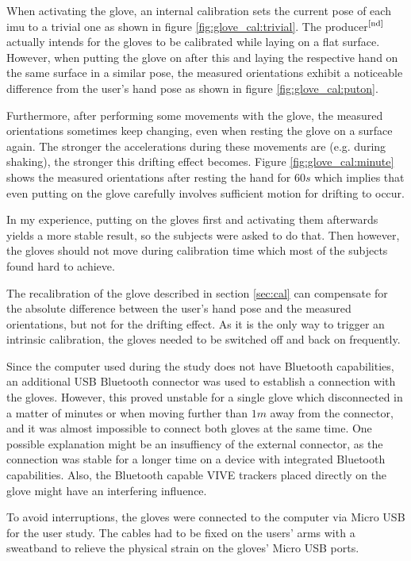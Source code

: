 \documentclass[hyperref, bachelorofscience]{cgvpub}
\newcommand{\newcite}[1]{$ ^{\text{\cite{#1}}} $}
\begin{document}
When activating the glove, an internal calibration sets the current pose of each \acrshort{imu} to a trivial one as shown in figure \ref{fig:glove_cal:trivial}. The producer\newcite{nd} actually intends for the gloves to be calibrated while laying on a flat surface. However, when putting the glove on after this and laying the respective hand on the same surface in a similar pose, the measured orientations exhibit a noticeable difference from the user's hand pose as shown in figure \ref{fig:glove_cal:puton}. 

Furthermore, after performing some movements with the glove, the measured orientations sometimes keep changing, even when resting the glove on a surface again. The stronger the accelerations during these movements are (e.g. during shaking), the stronger this drifting effect becomes. Figure \ref{fig:glove_cal:minute} shows the measured orientations after resting the hand for $ 60s $ which implies that even putting on the glove carefully involves sufficient motion for drifting to occur.

In my experience, putting on the gloves first and activating them afterwards yields a more stable result, so the subjects were asked to do that. Then however, the gloves should not move during calibration time which most of the subjects found hard to achieve.

The recalibration of the glove described in section \ref{sec:cal} can compensate for the absolute difference between the user's hand pose and the measured orientations, but not for the drifting effect. As it is the only way to trigger an intrinsic calibration, the gloves needed to be switched off and back on frequently. 

Since the computer used during the study does not have Bluetooth capabilities, an additional USB Bluetooth connector was used to establish a connection with the gloves. However, this proved unstable for a single glove which disconnected in a matter of minutes or when moving further than $ 1m $ away from the connector, and it was almost impossible to connect both gloves at the same time. One possible explanation might be an insuffiency of the external connector, as the connection was stable for a longer time on a device with integrated Bluetooth capabilities. Also, the Bluetooth capable \Gls{VIVE} trackers placed directly on the glove might have an interfering influence.

To avoid interruptions, the gloves were connected to the computer via Micro USB for the user study. The cables had to be fixed on the users' arms with a sweatband to relieve the physical strain on the gloves' Micro USB ports.
\end{document}
